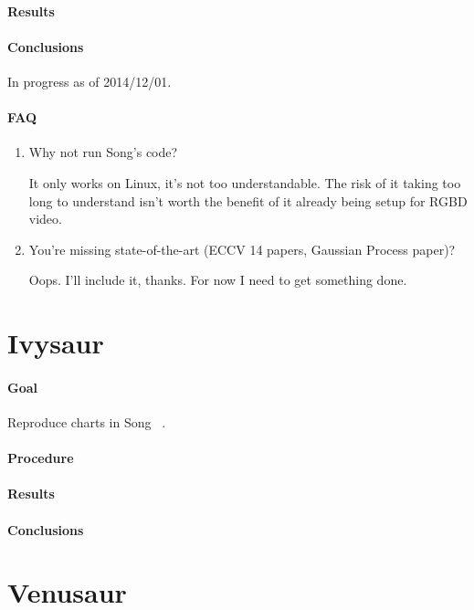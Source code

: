 \paragraph{Results}  
\paragraph{Conclusions}  
In progress as of 2014/12/01.

\paragraph{FAQ} 
\begin{enumerate}
    \item Why not run Song's code?
    
    It only works on Linux, it's not too understandable. The risk of it taking too long to understand isn't worth the benefit of it already being setup for RGBD video.
    
    \item You're missing state-of-the-art (ECCV 14 papers, Gaussian Process paper)?
    
    Oops. I'll include it, thanks. For now I need to get something done.
\end{enumerate}

\section{Ivysaur}
\label{exp:Ivysaur}
\paragraph{Goal} Reproduce charts in Song \etal~\cite{song2013tracking}.
\paragraph{Procedure}
\paragraph{Results}
\paragraph{Conclusions}
\section{Venusaur}

